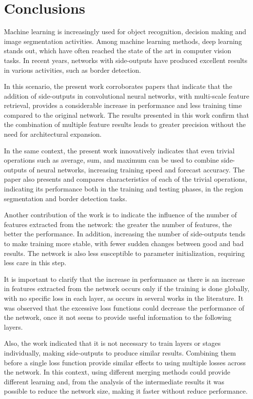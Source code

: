 \section{Conclusions}
\label{cap7_contribuicoes}
Machine learning is increasingly used for object recognition, decision making and image segmentation activities. 
Among machine learning methods, deep learning stands out, which have often reached the state of the art in computer vision tasks.
In recent years, networks with side-outputs have produced excellent results in various activities, such as border detection.%

In this scenario, the present work corroborates papers that indicate that the addition of side-outputs in convolutional neural networks, with multi-scale  feature retrieval, provides a considerable increase in performance and less training time compared to the original network.
The results presented in this work confirm that the combination of multiple feature results leads to greater precision without the need for architectural expansion.

In the same context, the present work innovatively indicates that even trivial operations such as average, sum, and maximum can be used to combine side-outputs of neural networks, increasing training speed and forecast accuracy.
The paper also presents and compares characteristics of each of the trivial operations, indicating its performance both in the training and testing phases, in the region segmentation and border detection tasks.

Another contribution of the work is to indicate the influence of the number of features extracted from the network: the greater the number of features, the better the performance.
In addition, increasing the number of side-outputs tends to make training more stable, with fewer sudden changes between good and bad results.
The network is also less susceptible to parameter initialization, requiring less care in this step.

It is important to clarify that the increase in performance as there is an increase in features extracted from the network occurs only if the training is done globally, with no specific loss in each layer, as occurs in several works in the literature.
It was observed that the excessive loss functions could decrease the performance of the network, once it not seens to provide useful information to the following layers.

Also, the work indicated that it is not necessary to train layers or stages individually, making side-outputs to produce similar results.
Combining them before a single loss function provide similar effects to using multiple losses across the network.
In this context, using different merging methods could provide different learning and, from the analysis of the intermediate results it was possible to reduce the network size, making it faster without reduce performance.

